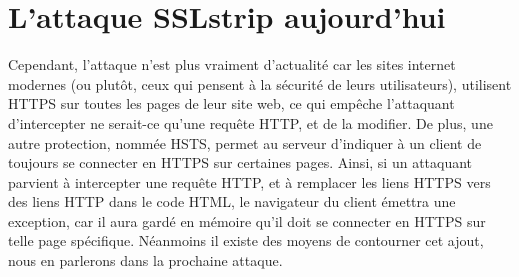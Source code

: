 \section{L'attaque SSLstrip aujourd'hui}

Cependant, l'attaque n'est plus vraiment d'actualité car les sites internet modernes (ou plutôt, ceux qui pensent à la sécurité de leurs utilisateurs), utilisent HTTPS sur toutes les pages de leur site web, ce qui empêche l'attaquant d'intercepter ne serait-ce qu'une requête HTTP, et de la modifier. De plus, une autre protection, nommée HSTS, permet au serveur d'indiquer à un client de toujours se connecter en HTTPS sur certaines pages. Ainsi, si un attaquant parvient à intercepter une requête HTTP, et à remplacer les liens HTTPS vers des liens HTTP dans le code HTML, le navigateur du client émettra une exception, car il aura gardé en mémoire qu'il doit se connecter en HTTPS sur telle page spécifique. Néanmoins il existe des moyens de contourner cet ajout, nous en parlerons dans la prochaine attaque.

